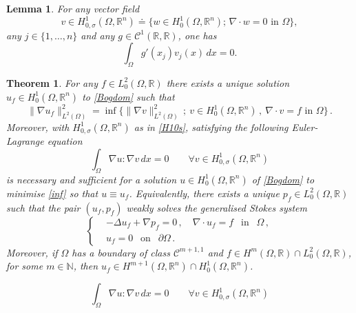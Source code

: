 \documentclass[10pt,a4paper]{amsart}
\newtheorem{lemma}{Lemma}
\newtheorem{theorem}{Theorem}
\newcommand{\R}{\mathbb{R}}
\begin{document}
\begin{lemma}\label{lem:lemma1}
For any vector field
\begin{equation}\label{H10s}
v \in H^{1}_{0,\sigma}(\Omega,\R^n)\doteq\{w\in H^1_0(\Omega,\R^n);\, \nabla \cdot w=0\mbox{ in }\Omega\},
\end{equation}
any $j\in\{1,\ldots,n\}$ and any $g\in\mathcal{C}^1(\R,\R)$, one has
\begin{equation} \label{exlemma}
\int_\Omega g'(x_j )v_j(x)\, dx=0.
\end{equation}	
\end{lemma}

\begin{theorem}\label{minBog}
For any $f\in L^2_0(\Omega,\R)$ there exists a unique solution
$u_f\in H^1_0(\Omega,\R^n)$ to \eqref{Bogdom} such that
\begin{equation}\label{inf}
\|\nabla u_f\|_{L^2(\Omega)}^2=\inf\Big\{\|\nabla v\|_{L^2(\Omega)}^2\, ;\ v\in H^1_0(\Omega,\R^n)\, ,\ \nabla\cdot v=f\text{ in }\Omega\Big\}\, .
\end{equation}
Moreover, with $H^1_{0,\sigma}(\Omega,\R^n)$ as in \eqref{H10s}, satisfying the following Euler-Lagrange equation
\begin{equation}\label{ELeq}
\int_\Omega \nabla u : \nabla v\, dx=0\qquad\forall v\in H^1_{0,\sigma}(\Omega,\R^n)
\end{equation}
is necessary and sufficient for a solution $u\in H^1_0(\Omega,\R^n)$ of \eqref{Bogdom} to minimise \eqref{inf} so that $u\equiv u_f$. Equivalently,
there exists a unique $p_{f} \in L^2_0(\Omega,\R)$ such that the pair $(u_{f},p_{f})$ weakly solves the generalised Stokes system
\begin{equation} \label{gstokes}
\left\{
\begin{aligned}
	& - \Delta u_{f} + \nabla p_{f} = 0 \, , \quad \nabla \cdot u_{f} = f \ \ \mbox{ in } \ \ \Omega \, , \\[5pt]
	& u_{f}=0 \ \ \mbox{ on } \ \ \partial \Omega  \, .
\end{aligned}
\right.
\end{equation}
Moreover, if $\Omega$ has a boundary of class $\mathcal{C}^{m+1,1}$ and $f\in H^{m}(\Omega, \mathbb{R}) \cap L^2_0(\Omega, \mathbb{R})$, for some $m \in \mathbb{N}$, then $u_f\in H^{m+1}(\Omega, \mathbb{R}^{n}) \cap H^1_0(\Omega, \mathbb{R}^{n})$.
\end{theorem}

\begin{equation}
\int_\Omega \nabla u : \nabla v\, dx=0\qquad\forall v\in H^1_{0,\sigma}(\Omega,\R^n)
\end{equation}
\end{document}
